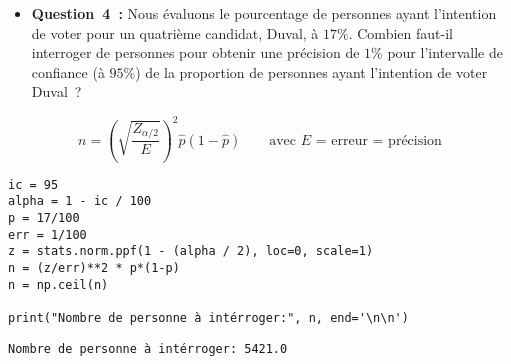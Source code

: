 \vspace{.5cm}


\begin{itemize}[label={},itemindent=-2em,leftmargin=2em]
    \item \textbf{Question~4~:} Nous évaluons le pourcentage de personnes ayant l’intention de voter pour un quatrième
    candidat, Duval, à $17\%$. Combien faut-il interroger de personnes pour obtenir une précision de
    $1\%$ pour l’intervalle de confiance (à $95\%$) de la proportion de personnes ayant l’intention de voter
    Duval~?
\end{itemize}
\vspace{.2cm}

\begin{equation}
    n = \left( \sqrt{\frac{Z_{\alpha/2}}{E}} \right)^{2} \hat{p}(1 - \hat{p}) \qquad \text{avec $E$ = erreur = précision}
    \label{eq:n}
\end{equation}

\vspace{.2cm}

\begin{lstlisting}[style=myPython, caption=Code Python question 4, frame=lines]
ic = 95
alpha = 1 - ic / 100
p = 17/100
err = 1/100
z = stats.norm.ppf(1 - (alpha / 2), loc=0, scale=1)
n = (z/err)**2 * p*(1-p)
n = np.ceil(n)

print("Nombre de personne à intérroger:", n, end='\n\n')
\end{lstlisting}

\begin{lstlisting}[style=myLog, caption=Résultat du code, frame=lines]
Nombre de personne à intérroger: 5421.0
\end{lstlisting}

\vspace{.5cm}
